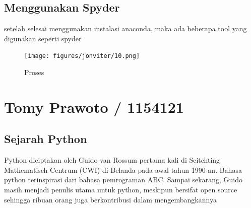 \subsection{Menggunakan Spyder}
setelah selesai menggunakan instalasi anaconda,  maka ada beberapa tool yang digunakan seperti spyder
\begin{figure}[!htbp]
        \centering
        \texttt{[image: figures/jonviter/10.png]}
        \caption{Proses}
        \label{awal}
        \end{figure}
\section {Tomy Prawoto / 1154121 }
\subsection{Sejarah Python}
Python diciptakan oleh Guido van Rossum pertama kali di Scitchting Mathematisch Centrum (CWI) di Belanda pada awal tahun 1990-an. Bahasa python terinspirasi dari bahasa pemrograman ABC. Sampai sekarang, Guido masih menjadi penulis utama untuk python, meskipun bersifat open source sehingga ribuan orang juga berkontribusi dalam mengembangkannya
